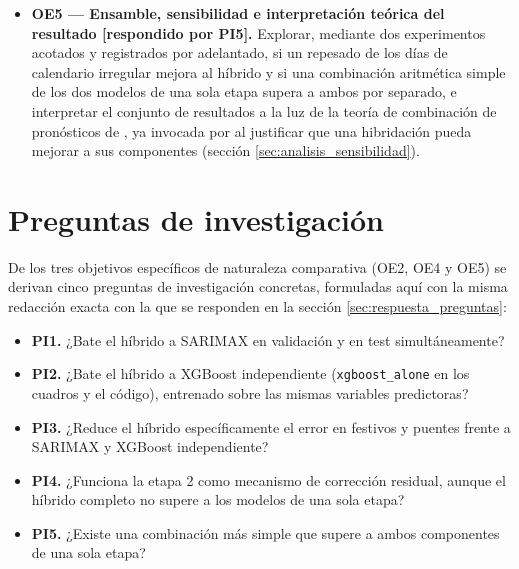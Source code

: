 \begin{itemize}
{    \textnormal{[respondido por PI3, PI4]}.} Entrenar
    un modelo XGBoost sobre los residuos \emph{out-of-fold} sanos de la etapa 1
    utilizando la matriz completa de 161 variables predictoras, y contrastar el resultado
    del híbrido completo frente a dos controles diseñados específicamente para aislar
    si la etapa 1 aporta valor o introduce ruido: la propia etapa 1 en solitario y un
    XGBoost entrenado directamente sobre la demanda total con idéntica matriz de
    variables (secciones \ref{sec:etapa2_xgboost} y \ref{sec:modelos_control}).
  \item \textbf{OE5 — Ensamble, sensibilidad e interpretación teórica del resultado
    \textnormal{[respondido por PI5]}.}
    Explorar, mediante dos experimentos acotados y registrados por adelantado, si un
    repesado de los días de calendario irregular mejora al híbrido y si una
    combinación aritmética simple de los dos modelos de una sola etapa supera a ambos
    por separado, e interpretar el conjunto de resultados a la luz de la teoría de
    combinación de pronósticos de \textcite{granger1989combining}, ya invocada por
    \textcite{zhang2003hybrid} al justificar que una hibridación pueda mejorar a sus
    componentes (sección \ref{sec:analisis_sensibilidad}).
\end{itemize}

\section{Preguntas de investigación}\label{sec:preguntas_investigacion}

De los tres objetivos específicos de naturaleza comparativa (OE2, OE4 y OE5) se derivan
cinco preguntas de investigación concretas, formuladas aquí con la misma redacción exacta
con la que se responden en la sección \ref{sec:respuesta_preguntas}:

\begin{itemize}
  \item \textbf{PI1.} ¿Bate el híbrido a SARIMAX en validación y en test
    simultáneamente?
  \item \textbf{PI2.} ¿Bate el híbrido a XGBoost independiente (\texttt{xgboost\_alone} en los cuadros y el código), entrenado sobre las
    mismas variables predictoras?
  \item \textbf{PI3.} ¿Reduce el híbrido específicamente el error en festivos y
    puentes frente a SARIMAX y XGBoost independiente?
  \item \textbf{PI4.} ¿Funciona la etapa 2 como mecanismo de corrección residual,
    aunque el híbrido completo no supere a los modelos de una sola etapa?
  \item \textbf{PI5.} ¿Existe una combinación más simple que supere a ambos
    componentes de una sola etapa?
\end{itemize}

